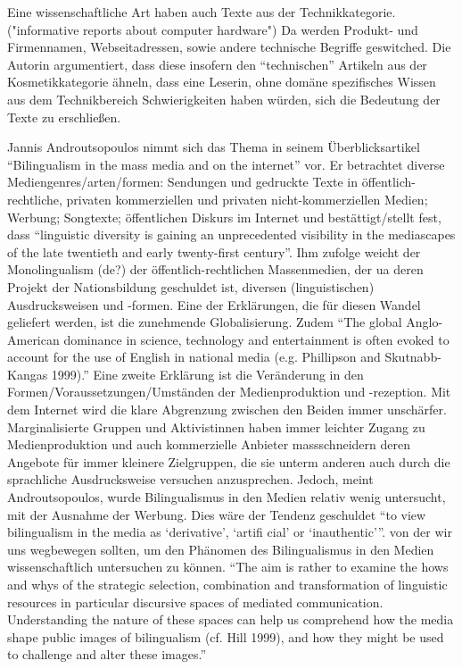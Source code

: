 Eine wissenschaftliche Art haben auch Texte aus der Technikkategorie. ("informative reports about computer hardware")
Da werden Produkt- und Firmennamen, Webseitadressen, sowie andere technische Begriffe geswitched.
Die Autorin argumentiert, dass diese insofern den ``technischen'' Artikeln aus der Kosmetikkategorie ähneln, dass eine Leserin, ohne domäne spezifisches Wissen aus dem Technikbereich Schwierigkeiten haben würden, sich die Bedeutung der Texte zu erschließen.


Jannis Androutsopoulos nimmt sich das Thema in seinem Überblicksartikel ``Bilingualism in the mass media and on the internet'' vor.
Er betrachtet diverse Mediengenres/arten/formen: Sendungen und gedruckte Texte in öffentlich-rechtliche, privaten kommerziellen und privaten nicht-kommerziellen Medien; Werbung; Songtexte; öffentlichen Diskurs im Internet %
und bestättigt/stellt fest, dass ``linguistic diversity is gaining an unprecedented visibility in the mediascapes of the late twentieth and early twenty-first century''.
Ihm zufolge weicht der Monolingualism (de?) der öffentlich-rechtlichen Massenmedien, der ua deren Projekt der Nationsbildung geschuldet ist, diversen (linguistischen) Ausdrucksweisen und -formen.
Eine der Erklärungen, die für diesen Wandel geliefert werden, ist die zunehmende Globalisierung.
Zudem ``The global Anglo-American dominance in science, technology and entertainment is often evoked to account for the use of English in national media (e.g. Phillipson and Skutnabb-Kangas 1999).''
Eine zweite Erklärung ist die Veränderung in den Formen/Voraussetzungen/Umständen der Medienproduktion und -rezeption.
Mit dem Internet wird die klare Abgrenzung zwischen den Beiden immer unschärfer.
Marginalisierte Gruppen und Aktivistinnen haben immer leichter Zugang zu Medienproduktion und auch kommerzielle Anbieter massschneidern deren Angebote für immer kleinere Zielgruppen, die sie unterm anderen auch durch die sprachliche Ausdrucksweise versuchen anzusprechen.
Jedoch, meint Androutsopoulos, wurde Bilingualismus in den Medien relativ wenig untersucht, mit der Ausnahme der Werbung.
Dies wäre der Tendenz geschuldet ``to view bilingualism in the media as ‘derivative’, ‘artifi cial’ or ‘inauthentic’''. %
von der wir uns wegbewegen sollten, um den Phänomen des Bilingualismus in den Medien wissenschaftlich untersuchen zu können.
``The aim is rather to examine the
hows and whys of the strategic selection, combination and transformation of
linguistic resources in particular discursive spaces of mediated communication.
Understanding the nature of these spaces can help us comprehend how the
media shape public images of bilingualism (cf. Hill 1999), and how they
might be used to challenge and alter these images.'' %



